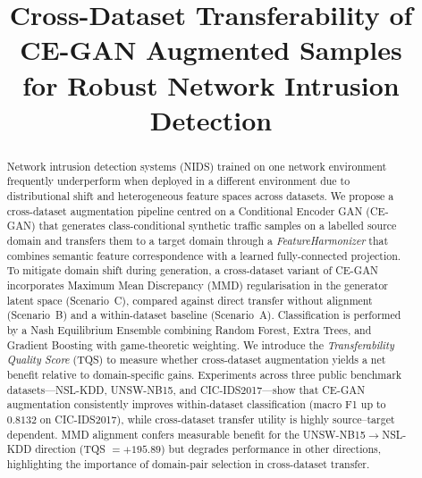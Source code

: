\documentclass[conference]{IEEEtran}
\begin{document}
\title{Cross-Dataset Transferability of CE-GAN Augmented Samples\\
for Robust Network Intrusion Detection}

\author{
\and
{}
}

\maketitle

\begin{abstract}
Network intrusion detection systems (NIDS) trained on one network environment
frequently underperform when deployed in a different environment due to
distributional shift and heterogeneous feature spaces across datasets.
We propose a cross-dataset augmentation pipeline centred on a
Conditional Encoder GAN (CE-GAN) that generates class-conditional synthetic
traffic samples on a labelled source domain and transfers them to a target domain
through a \emph{FeatureHarmonizer} that combines semantic feature correspondence
with a learned fully-connected projection.
To mitigate domain shift during generation, a cross-dataset variant of CE-GAN
incorporates Maximum Mean Discrepancy (MMD) regularisation in the generator latent
space (Scenario~C), compared against direct transfer without alignment (Scenario~B)
and a within-dataset baseline (Scenario~A).
Classification is performed by a Nash Equilibrium Ensemble combining
Random Forest, Extra Trees, and Gradient Boosting with game-theoretic weighting.
We introduce the \emph{Transferability Quality Score} (TQS) to measure
whether cross-dataset augmentation yields a net benefit relative to domain-specific gains.
Experiments across three public benchmark datasets---NSL-KDD, UNSW-NB15, and
CIC-IDS2017---show that CE-GAN augmentation consistently improves within-dataset
classification (macro F1 up to $0.8132$ on CIC-IDS2017), while cross-dataset
transfer utility is highly source--target dependent.
MMD alignment confers measurable benefit for the UNSW-NB15$\to$NSL-KDD
direction (TQS $= +195.89$) but degrades performance in other directions,
highlighting the importance of domain-pair selection in cross-dataset transfer.
\end{abstract}
\end{document}
